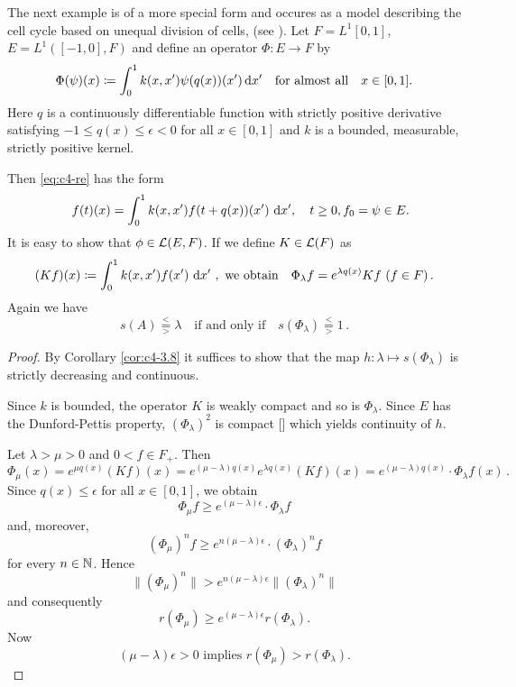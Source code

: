 \begin{example}\label{ex:c4-3.11}
The next example is of a more special form and occures as a model describing the cell cycle based on unequal division of cells, (see  \citet{arinokimmel:1985}).
Let $F = L^{1}[0,1]$,\, $E = L^{1}([-1,0], F)$ and define an operator $\Phi \colon E \to F$ by
\[
\Phi(\psi)(x) \coloneqq \int_0^1 k(x,x')\psi(q(x))(x') \mathop{}\!\mathrm{d}{x}' \quad \text{for almost all} \quad x \in [0,1].
\]
Here $q$ is a continuously differentiable function with strictly positive derivative satisfying $-1 \leq q(x) \leq \epsilon < 0$ for all $x \in [0,1]$ and $k$ is a bounded, measurable, strictly positive kernel.

Then \eqref{eq:c4-re} has the form
\begin{equation} \label{eq:c4-3.12}
\quad f(t)(x) = \int_{0}^{1} k(x,x')f(t+q(x))(x') \, \mathop{}\!\mathrm{d}{x}', \quad t \geq 0, f_{0} = \psi \in E.
\end{equation}
It is easy to show that $\phi \in \mathcal{L}(E,F)$.
If we define $K \in \mathcal{L}(F)$  as 
\[
(Kf)(x) \coloneqq \int_{0}^{1} k(x,x')f(x') \, \mathop{}\!\mathrm{d}{x}' \ ,
\ \text{we obtain} \quad 
\Phi_{\lambda}f = e^{\lambda q(x)}Kf \,\, (f \in F)\,.
\]
Again we have 
\begin{equation*}\label{eq:c4-3.12-kgk1}
s(A) \overset{<}{ \underset{>}{=} }\lambda \quad \text{if and only if} \quad s(\Phi_{\lambda}) \overset{<}{ \underset{>}{=} } 1 \,.
\end{equation*}
\end{example}

\begin{proof}
By Corollary \ref{cor:c4-3.8} it suffices to show that the map $h \colon \lambda \mapsto s(\Phi_{\lambda})$ is strictly decreasing and continuous.

Since $k$ is bounded, the operator $K$ is weakly compact and so is $\Phi_{\lambda}$.
Since $E$ has the Dunford-Pettis property, $(\Phi_{\lambda})^{2}$ is compact [\citet[Theorem II.9.9]{schaefer:1974}] which yields continuity of $h$.

Let $\lambda > \mu > 0$ and $0 < f \in F_{+}$.
Then 
\[
\Phi_{\mu}(x) = 
e^{\mu q(x)}(Kf)(x) = 
e^{(\mu-\lambda)q(x)}e^{\lambda q(x)}(Kf)(x) =
e^{(\mu-\lambda)q(x)} \cdot \Phi_{\lambda}f(x)\,.
\]
Since $q(x) \leq \epsilon$ for all $x \in [0,1]$, we obtain 
\[
\Phi_{\mu}f \geq e^{(\mu-\lambda)\epsilon} \cdot \Phi_{\lambda}f
\]
and, moreover, 
\[
(\Phi_{\mu})^n f \geq e^{n(\mu-\lambda)\epsilon} \cdot (\Phi_{\lambda})^n f
\]
for every $n \in \mathbb{N}$.
Hence 
\[
\|(\Phi_{\mu})^n\| > e^{n(\mu-\lambda)\epsilon}\|(\Phi_{\lambda})^n\|
\]
and consequently 
\[
r(\Phi_{\mu}) \geq e^{(\mu-\lambda)\epsilon}r(\Phi_{\lambda}) .
\]
Now 
\[
\text{$(\mu-\lambda)\epsilon > 0$ implies 
$r(\Phi_{\mu}) > r(\Phi_{\lambda})$.}
\]
\end{proof}

